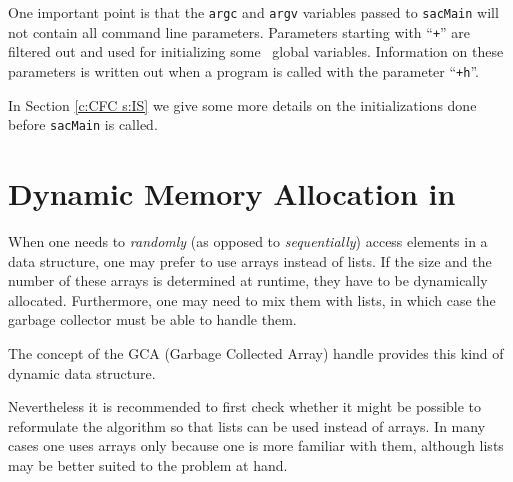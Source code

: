 One important point is that the {\tt argc} and {\tt argv} variables passed
to {\tt sacMain} will not contain all command line parameters. Parameters
starting with ``{\tt +}'' are filtered out and used for initializing some
\saclib\ global variables. Information on these parameters is written out
when a program is called with the parameter ``{\tt +h}''.

In Section \ref{c:CFC s:IS} we give some more details on the
initializations done before {\tt sacMain} is called.


\section{Dynamic Memory Allocation in \saclib}
\label{c:CFC s:MA}

When one needs to {\em randomly} (as opposed to {\em sequentially}) access
elements in a data structure, one may prefer to use arrays instead of lists.
If the size and the number of these arrays is determined at runtime, they have
to be dynamically allocated. Furthermore, one may need to mix them with lists,
in which case the garbage collector must be able to handle them.

The concept of the GCA (Garbage Collected Array) handle
provides this kind of dynamic data structure.

Nevertheless it is recommended to first check whether it might be possible to
reformulate the algorithm so that lists can be used instead of arrays. In many
cases one uses arrays only because one is more familiar with them, although
lists may be better suited to the problem at hand.

